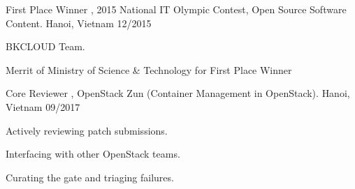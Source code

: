 
\begin{cvhonors}

  \cvhonor
    {First Place Winner} %
    {, 2015 National IT Olympic Contest, Open Source Software Content.} %
    {Hanoi, Vietnam} %
    {12/2015} %

  \cvhonor
 	{} %
	{BKCLOUD Team.} %
    {} %
    {} %

  \cvhonor
    {Merrit of Ministry of Science \& Technology for First Place Winner} %
    {} %
    {} %
    {} %

  \cvhonor
    {Core Reviewer} %
    {, OpenStack Zun (Container Management in OpenStack).} %
    {Hanoi, Vietnam} %
    {09/2017} %

  \cvhonor
 	{} %
	{Actively reviewing patch submissions.} %
    {} %
    {} %

  \cvhonor
 	{} %
	{Interfacing with other OpenStack teams.} %
    {} %
    {} %

  \cvhonor
 	{} %
	{Curating the gate and triaging failures.} %
    {} %
    {} %

\end{cvhonors}
